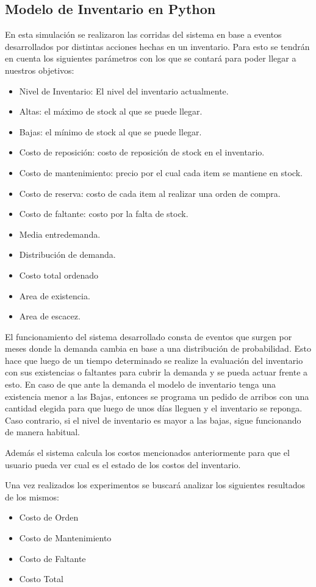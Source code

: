 \subsection{Modelo de Inventario en Python}
En esta simulación se realizaron las corridas del sistema en base a eventos desarrollados por distintas acciones hechas en un inventario.
Para esto se tendrán en cuenta los siguientes parámetros con los que se contará para poder llegar a nuestros objetivos:
\begin{itemize}
    \item Nivel de Inventario: El nivel del inventario actualmente.
    \item Altas: el máximo de stock al que se puede llegar.
    \item Bajas: el mínimo de stock al que se puede llegar.
    \item Costo de reposición: costo de reposición de stock en el inventario.
    \item Costo de mantenimiento: precio por el cual cada item se mantiene en stock.
    \item Costo de reserva: costo de cada item al realizar una orden de compra.
    \item Costo de faltante: costo por la falta de stock.
    \item Media entredemanda.
    \item Distribución de demanda.
    \item Costo total ordenado
    \item Area de existencia.
    \item Area de escacez.
\end{itemize}

El funcionamiento del sistema desarrollado consta de eventos que surgen por meses donde la demanda cambia en base a una distribución de probabilidad.
Esto hace que luego de un tiempo determinado se realize la evaluación del inventario con sus existencias o faltantes para cubrir la demanda y se pueda actuar frente a esto.
En caso de que ante la demanda el modelo de inventario tenga una existencia menor a las Bajas, entonces se programa un pedido de arribos con una cantidad elegida para que luego de unos días lleguen y el inventario se reponga.
Caso contrario, si el nivel de inventario es mayor a las bajas, sigue funcionando de manera habitual.

Además el sistema calcula los costos mencionados anteriormente para que el usuario pueda ver cual es el estado de los costos del inventario.


Una vez realizados los experimentos se buscará analizar los siguientes resultados de los mismos:
\begin{itemize}
    \item Costo de Orden
    \item Costo de Mantenimiento
    \item Costo de Faltante
    \item Costo Total
\end{itemize}